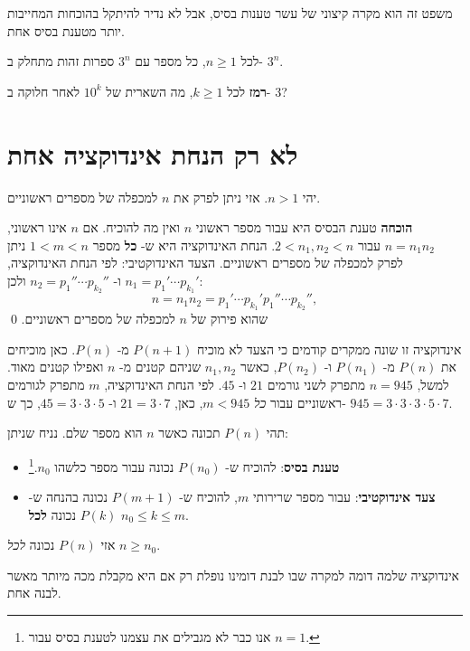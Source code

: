 משפט זה הוא מקרה קיצוני של עשר טענות בסיס, אבל לא נדיר להיתקל בהוכחות המחייבות יותר מטענת בסיס אחת.

\begin{exercise}
לכל
$n\geq 1$,
כל מספר עם
$3^n$
ספרות זהות מתחלק ב-%
$3^n$.
\end{exercise}
\textbf{רמז}
לכל
$k\geq 1$,
מה השארית של
$10^k$
לאחר חלוקה ב-%
$3$?

\section{%
לא רק הנחת אינדוקציה אחת%
}

\begin{theorem}\label{t.prime}
יהי
$n>1$.
אזי ניתן לפרק את
$n$
למכפלה של מספרים ראשוניים.
\end{theorem}

\textbf{הוכחה} 
טענת הבסיס היא עבור מספר ראשוני
$n$
ואין מה להוכיח.
אם
$n$
אינו ראשוני,
$n=n_1 n_2$
עבור
$2 < n_1, n_2 < n$.
הנחת האינדוקציה היא ש-%
\textbf{כל}
מספר
$1<m<n$
ניתן לפרק למכפלה של מספרים ראשוניים. הצעד האינדוקטיבי: לפי הנחת האינדוקציה,
$n_1=p_1' \cdots p_{k_1}'$
ו-%
$n_2=p_1'' \cdots p_{k_2}''$
ולכן:
\[
n = n_1 n_2 = p_1' \cdots p_{k_1}' p_1'' \cdots p_{k_2}'',
\]
שהוא פירוק של
$n$
למכפלה של מספרים ראשוניים.
\qed

אינדוקציה זו שונה ממקרים קודמים כי הצעד לא מוכיח 
$P(n+1)$
מ-%
$P(n)$.
כאן מוכיחים את
$P(n)$
מ-%
$P(n_1)$
ו-%
$P(n_2)$,
כאשר 
$n_1,n_2$
שניהם קטנים מ-%
$n$
ואפילו קטנים מאוד. למשל,
$n=945$
מתפרק לשני גורמים
$21$
ו-%
$45$.
לפי הנחת האינדוקציה,
$m$
מתפרק לגורמים ראשוניים עבור
\emph{כל}
$m<945$,
כאן,
$21=3\cdot 7$
ו-%
$45=3\cdot 3\cdot 5$,
כך ש-%
$945=3\cdot 3\cdot 3\cdot 5\cdot 7$.

\begin{axiom}
תהי
$P(n)$
תכונה כאשר
$n$
הוא מספר שלם. נניח שניתן:
\begin{itemize}
\item \textbf{טענת בסיס}:
להוכיח ש-%
$P(n_0)$
נכונה עבור מספר כלשהו
$n_0$.\footnote{%
אנו כבר לא מגבילים את עצמנו לטענת בסיס עבור
$n=1$.} 
\item \textbf{צעד אינדוקטיבי}:
עבור מספר שרירותי
$m$,
להוכיח ש-%
$P(m+1)$
נכונה בהנחה ש-%
$P(k)$
נכונה
\textbf{לכל}
$n_0\leq k\leq m$.
\end{itemize}
אזי
$P(n)$
נכונה
\emph{לכל}
$n\geq n_0$.
\end{axiom}

אינדוקציה שלמה דומה למקרה שבו לבנת דומינו נופלת רק אם היא מקבלת מכה מיותר מאשר לבנה אחת.

